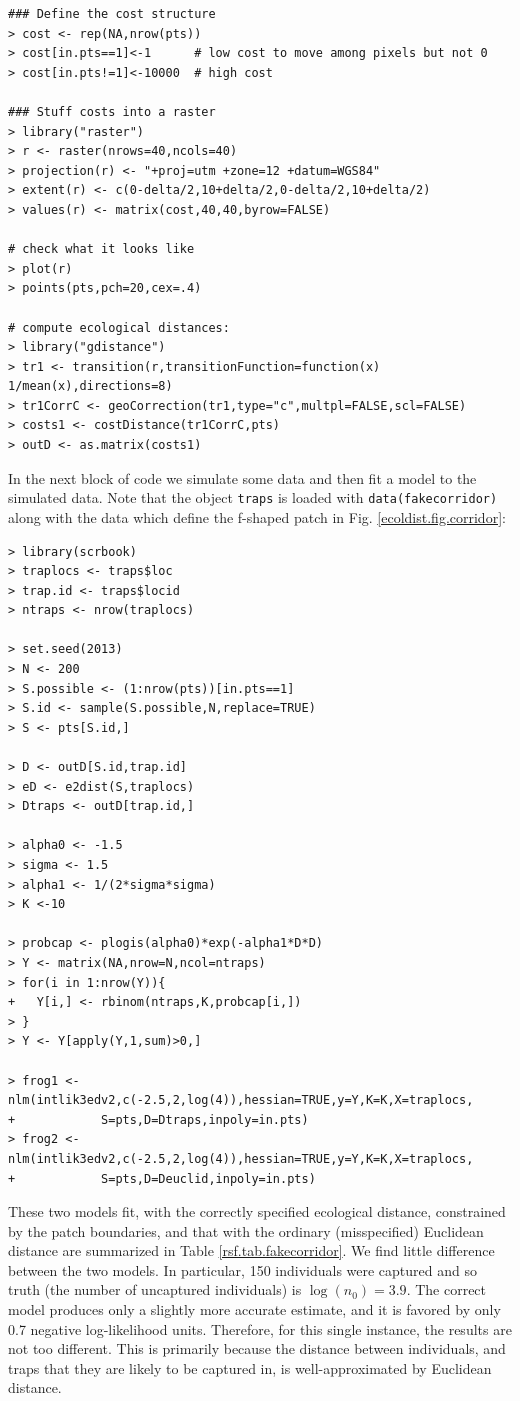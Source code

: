 {\small
\begin{verbatim}
### Define the cost structure
> cost <- rep(NA,nrow(pts))
> cost[in.pts==1]<-1      # low cost to move among pixels but not 0
> cost[in.pts!=1]<-10000  # high cost

### Stuff costs into a raster
> library("raster")
> r <- raster(nrows=40,ncols=40)
> projection(r) <- "+proj=utm +zone=12 +datum=WGS84"
> extent(r) <- c(0-delta/2,10+delta/2,0-delta/2,10+delta/2)
> values(r) <- matrix(cost,40,40,byrow=FALSE)

# check what it looks like
> plot(r)
> points(pts,pch=20,cex=.4)

# compute ecological distances:
> library("gdistance")
> tr1 <- transition(r,transitionFunction=function(x) 1/mean(x),directions=8)
> tr1CorrC <- geoCorrection(tr1,type="c",multpl=FALSE,scl=FALSE)
> costs1 <- costDistance(tr1CorrC,pts)
> outD <- as.matrix(costs1)
\end{verbatim}
}

In the next block of code we simulate some data and then fit a model
to the simulated data.  Note that the object \mbox{\tt traps} is
loaded with \mbox{\tt data(fakecorridor)} along with the data which
define the f-shaped patch in
Fig. \ref{ecoldist.fig.corridor}:
{\small
\begin{verbatim}
> library(scrbook)
> traplocs <- traps$loc
> trap.id <- traps$locid
> ntraps <- nrow(traplocs)

> set.seed(2013)
> N <- 200
> S.possible <- (1:nrow(pts))[in.pts==1]
> S.id <- sample(S.possible,N,replace=TRUE)
> S <- pts[S.id,]

> D <- outD[S.id,trap.id]
> eD <- e2dist(S,traplocs)
> Dtraps <- outD[trap.id,]

> alpha0 <- -1.5
> sigma <- 1.5
> alpha1 <- 1/(2*sigma*sigma)
> K <-10

> probcap <- plogis(alpha0)*exp(-alpha1*D*D)
> Y <- matrix(NA,nrow=N,ncol=ntraps)
> for(i in 1:nrow(Y)){
+   Y[i,] <- rbinom(ntraps,K,probcap[i,])
> }
> Y <- Y[apply(Y,1,sum)>0,]

> frog1 <- nlm(intlik3edv2,c(-2.5,2,log(4)),hessian=TRUE,y=Y,K=K,X=traplocs,
+            S=pts,D=Dtraps,inpoly=in.pts)
> frog2 <- nlm(intlik3edv2,c(-2.5,2,log(4)),hessian=TRUE,y=Y,K=K,X=traplocs,
+            S=pts,D=Deuclid,inpoly=in.pts)
\end{verbatim}
}

These two models fit, with the correctly specified ecological
distance, constrained by the patch boundaries, and that with the
ordinary (misspecified) Euclidean distance are summarized in Table \ref{rsf.tab.fakecorridor}.
We find little difference between the two models. In
particular, 150 individuals were captured and so truth (the number of
uncaptured individuals) is $\log(n_{0}) = 3.9$.
The correct model produces only a slightly more accurate  estimate, and
it is favored by only 0.7 negative log-likelihood units.
Therefore, for this single instance, the results are not too different.
This is primarily because
 the distance between individuals, and traps that they are likely
to be captured in, is well-approximated by %
Euclidean distance.


